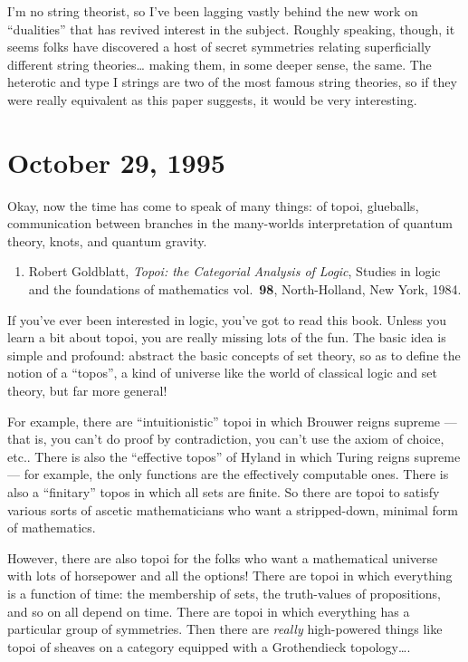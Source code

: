 \documentclass{article}
\def\tightlist{}
\begin{document}
I'm no string theorist, so I've been lagging vastly behind the new work
on ``dualities'' that has revived interest in the subject. Roughly
speaking, though, it seems folks have discovered a host of secret
symmetries relating superficially different string theories\ldots{}
making them, in some deeper sense, the same. The heterotic and type I
strings are two of the most famous string theories, so if they were
really equivalent as this paper suggests, it would be very interesting.



\hypertarget{week68}{%
\section{October 29, 1995}\label{week68}}

Okay, now the time has come to speak of many things: of topoi,
glueballs, communication between branches in the many-worlds
interpretation of quantum theory, knots, and quantum gravity.

\begin{enumerate}
\def\labelenumi{\arabic{enumi})}
\tightlist
\item
  Robert Goldblatt, \emph{Topoi: the Categorial Analysis of Logic},
  Studies in logic and the foundations of mathematics vol.~\textbf{98},
  North-Holland, New York, 1984.
\end{enumerate}

If you've ever been interested in logic, you've got to read this book.
Unless you learn a bit about topoi, you are really missing lots of the
fun. The basic idea is simple and profound: abstract the basic concepts
of set theory, so as to define the notion of a ``topos'', a kind of
universe like the world of classical logic and set theory, but far more
general!

For example, there are ``intuitionistic'' topoi in which Brouwer reigns
supreme --- that is, you can't do proof by contradiction, you can't use
the axiom of choice, etc.. There is also the ``effective topos'' of
Hyland in which Turing reigns supreme --- for example, the only
functions are the effectively computable ones. There is also a
``finitary'' topos in which all sets are finite. So there are topoi to
satisfy various sorts of ascetic mathematicians who want a
stripped-down, minimal form of mathematics.

However, there are also topoi for the folks who want a mathematical
universe with lots of horsepower and all the options! There are topoi in
which everything is a function of time: the membership of sets, the
truth-values of propositions, and so on all depend on time. There are
topoi in which everything has a particular group of symmetries. Then
there are \emph{really} high-powered things like topoi of sheaves on a
category equipped with a Grothendieck topology\ldots.
\end{document}

